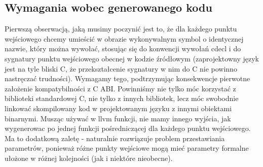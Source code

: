 \subsection{Wymagania wobec generowanego kodu}
Pierwszą obserwacją, jaką musimy poczynić jest to, że dla każdego punktu wejściowego chcemy umieścić w obrazie wykonywalnym symbol o identycznej nazwie, który można wywołać, stosując się do konwencji wywołań cdecl i do sygnatury punktu wejściowego obecnej w kodzie źródłowym (zaprojektowny język jest na tyle bliski C, że przekształcenie sygnatury w nim do C nie powinno nastręczać trudności). Wymagamy tego, podtrzymując konsekwencje pierwotne założenie kompatybilności z C ABI. Powinniśmy nie tylko móc korzystać z biblioteki standardowej C, nie tylko z innych bibliotek, lecz móc swobodnie linkować skompilowany kod w projektowanym języku z innymi obiektami binarnymi. Musząc używać w llvm  funkcji, nie mamy innego wyjścia, jak wygenerowac po jednej funkcji pośredniczącej dla każdego punktu wejściowego. Ma to dodatkową zaletę - naturalnie rozwiązuje problem przestawiania parametrów, ponieważ różne punkty wejściowe mogą mieć parametry formalne ułożone w różnej kolejności (jak i niektóre nieobecne).

